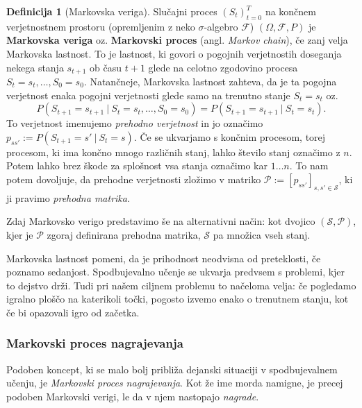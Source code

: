 \documentclass[12pt,a4paper]{amsart}
\theoremstyle{definition} %
\newtheorem{definicija}{Definicija}[section]
\theoremstyle{plain} %
\begin{document}
\begin{definicija}[Markovska veriga]\label{MarkovChain}
    Slučajni proces $(S_t)_{t=0}^T$ na končnem verjetnostnem prostoru (opremljenim z neko $\sigma$-algebro
    $\mathcal{F}$) $(\Omega, \mathcal{F}, P)$ je \textbf{Markovska veriga} oz. \textbf{Markovski proces} 
    (angl. \textit{Markov chain}), če zanj velja Markovska lastnost. To je lastnost, ki govori o 
    pogojnih verjetnostih doseganja nekega stanja $s_{t+1}$ ob času $t + 1$ glede na celotno zgodovino
    procesa $S_{t} = s_{t}, \dots, S_0 = s_0$. Natančneje, Markovska lastnost zahteva, da je ta 
    pogojna verjetnost enaka pogojni verjetnosti glede samo na trenutno stanje $S_{t} = s_{t}$ oz.
    $$
    P(S_{t+1} = s_{t+1}~|~S_{t} = s_{t}, \dots, S_0 = s_0) = P(S_{t+1} = s_{t+1}~|~S_{t} = s_{t}).
    $$
    To verjetnost imenujemo \textit{prehodno verjetnost} in jo označimo $p_{ss'} := P(S_{t+1} = 
    s'~|~S_{t} = s)$. Če se ukvarjamo s končnim procesom, torej procesom, ki ima končno mnogo 
    različnih stanj, lahko število stanj označimo z $n$. Potem lahko brez škode za splošnost 
    vsa stanja označimo kar $1 \dots n$. To nam potem dovoljuje, da prehodne verjetnosti zložimo v 
    matriko $\mathcal{P} := [p_{ss'}]_{s,s'\in \mathcal{S} }$, ki ji pravimo \textit{prehodna matrika}.

    Zdaj Markovsko verigo predstavimo še na alternativni način: kot dvojico $(\mathcal{S}, 
    \mathcal{P})$, kjer je $\mathcal{P}$ zgoraj definirana prehodna matrika, $\mathcal{S}$ pa 
    množica vseh stanj.
\end{definicija}

Markovska lastnost pomeni, da je prihodnost neodvisna od preteklosti, če poznamo sedanjost. 
Spodbujevalno učenje se ukvarja predvsem s problemi, kjer to dejstvo drži. Tudi pri našem 
ciljnem problemu to načeloma velja: če pogledamo igralno ploščo na katerikoli točki, pogosto 
izvemo enako o trenutnem stanju, kot če bi opazovali igro od začetka.

\subsubsection{Markovski proces nagrajevanja}
Podoben koncept, ki se malo bolj približa dejanski situaciji v spodbujevalnem učenju, je
\textit{Markovski proces nagrajevanja}. Kot že ime morda namigne, je precej podoben Markovski 
verigi, le da v njem nastopajo \textit{nagrade}. 
\end{document}
